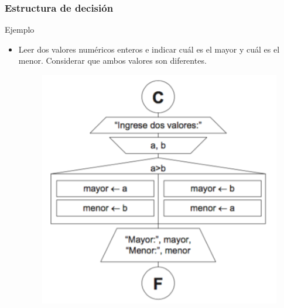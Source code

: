 \documentclass[handout]{beamer}
\begin{document}
\begin{frame}[t]\frametitle{Estructura de decisión}
    
Ejemplo
\begin{itemize}
  \item Leer dos valores numéricos enteros e indicar cuál es el mayor y cuál es el menor. Considerar que ambos valores son diferentes.
  \begin{figure}[tb]
     \centering
     \includegraphics[scale=.7]{./img/if}
   \end{figure} 
\end{itemize}


\end{frame}
\end{document}
